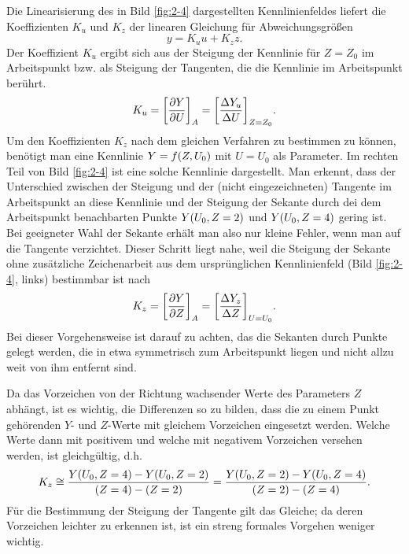 Die Linearisierung des in Bild \ref{fig:2-4} dargestellten Kennlinienfeldes liefert die Koeffizienten \(K_u\) und \(K_z\) der linearen Gleichung für Abweichungsgrößen
\begin{equation}
    y = K_u u + K_z z.
\end{equation}
Der Koeffizient \(K_u\) ergibt sich aus der Steigung der Kennlinie für \(Z = Z_0\) im Arbeitspunkt bzw. als Steigung der Tangenten, die die Kennlinie im Arbeitspunkt berührt.
\begin{equation}
    K_u = \brackets*{\frac{\partial Y}{\partial U}}_A = \brackets*{\frac{\Delta Y_u}{\Delta U}}_{Z = Z_0}.
\end{equation}
Um den Koeffizienten \(K_z\) nach dem gleichen Verfahren zu bestimmen zu können, benötigt man eine Kennlinie \(Y = f\parentheses*{Z, U_0}\) mit \(U = U_0\) als Parameter.
Im rechten Teil von Bild \ref{fig:2-4} ist eine solche Kennlinie dargestellt.
Man erkennt, dass der Unterschied zwischen der Steigung und der (nicht eingezeichneten) Tangente im Arbeitspunkt an diese Kennlinie und der Steigung der Sekante durch dei dem Arbeitspunkt benachbarten Punkte \(Y\parentheses*{U_0, Z = 2}\) und \(Y\parentheses*{U_0, Z = 4}\) gering ist.
Bei geeigneter Wahl der Sekante erhält man also nur kleine Fehler, wenn man auf die Tangente verzichtet.
Dieser Schritt liegt nahe, weil die Steigung der Sekante ohne zusätzliche Zeichenarbeit aus dem ursprünglichen Kennlinienfeld (Bild \ref{fig:2-4}, links) bestimmbar ist nach
\begin{equation}
    K_z = \brackets*{\frac{\partial Y}{\partial Z}}_A = \brackets*{\frac{\Delta Y_z}{\Delta Z}}_{U = U_0}.
\end{equation}
Bei dieser Vorgehensweise ist darauf zu achten, das die Sekanten durch Punkte gelegt werden, die in etwa symmetrisch zum Arbeitspunkt liegen und nicht allzu weit von ihm entfernt sind.

Da das Vorzeichen von der Richtung wachsender Werte des Parameters \(Z\) abhängt, ist es wichtig, die Differenzen so zu bilden, dass die zu einem Punkt gehörenden \(Y\)- und \(Z\)-Werte mit gleichem Vorzeichen eingesetzt werden.
Welche Werte dann mit positivem und welche mit negativem Vorzeichen versehen werden, ist gleichgültig, d.h.
\begin{equation}
    K_z \cong \frac{Y\parentheses*{U_0, Z = 4} - Y\parentheses*{U_0, Z = 2}}{\parentheses*{Z = 4} - \parentheses*{Z = 2}} = \frac{Y\parentheses*{U_0, Z = 2} - Y\parentheses*{U_0, Z = 4}}{\parentheses*{Z = 2} - \parentheses*{Z = 4}}.
\end{equation}
Für die Bestimmung der Steigung der Tangente gilt das Gleiche; da deren Vorzeichen leichter zu erkennen ist, ist ein streng formales Vorgehen weniger wichtig.

